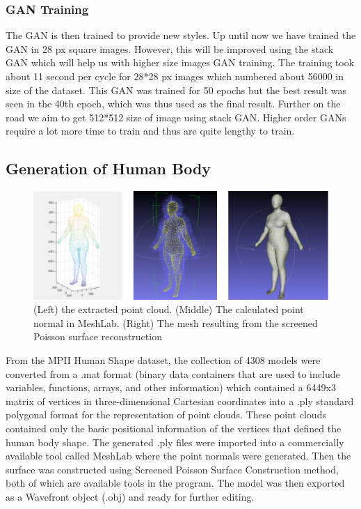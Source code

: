 \documentclass{article}
\begin{document}
    \subsubsection{GAN Training}
    The GAN is then trained to provide new styles. Up until now we have trained the GAN in 28 px square images. However, this will be improved using the stack GAN which will help us with higher size images GAN training. The training took about 11 second per cycle for 28*28 px images which numbered about 56000 in size of the dataset. This GAN was trained for 50 epochs but the best result was seen in the 40th epoch, which was thus used as the final result. Further on the road we aim to get 512*512 size of image using stack GAN. Higher order GANs require a lot more time to train and thus are quite lengthy to train.
    
    \subsection{Generation of Human Body}
    
    \begin{figure}[h]
        \centering
        \includegraphics{images/humanModel.png}
        \caption{(Left) the extracted point cloud. (Middle) The calculated point normal in MeshLab. (Right) The mesh resulting from the screened Poisson surface reconstruction}
        \label{(Left) the extracted point cloud. (Middle) The calculated point normal in MeshLab. (Right) The mesh resulting from the screened Poisson surface reconstruction(Left) the extracted point cloud. (Middle) The calculated point normal in MeshLab. (Right) The mesh resulting from the screened Poisson surface reconstruction}
    \end{figure}
    From the MPII Human Shape dataset, the collection of 4308 models were converted from a .mat format (binary data containers that are used to include variables, functions, arrays, and other information) which contained a 6449x3 matrix of vertices in three-dimensional Cartesian coordinates into a .ply standard polygonal format for the representation of point clouds. These point clouds contained only the basic positional information of the vertices that defined the human body shape. The generated .ply files were imported into a commercially available tool called MeshLab where the point normals were generated. Then the surface was constructed using Screened Poisson Surface Construction method, both of which are available tools in the program. The model was then exported as a Wavefront object (.obj) and ready for further editing.
    
\end{document}
